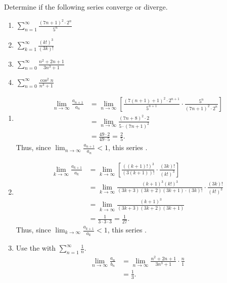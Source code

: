 \documentclass[noinstructornotes]{ximera}
\begin{document}
\begin{problem}
Determine if the following series converge or diverge.
	\begin{enumerate}
	
	\item  $\sum_{n=1}^\infty \frac{(7n+1)^2 \cdot 2^n}{5^n}$
	
	
	\item $\sum_{k=1}^{\infty} \frac{(k!)^3}{(3k)!}$
	
	\item  $\sum_{n=0}^\infty \frac{n^2 + 2n + 1}{3n^3+1}$
	
	\item  $\sum_{n=0}^\infty \frac{\cos^2 n}{n^3+1}$
	
	
	\end{enumerate}
	
	\begin{freeResponse}
		\begin{enumerate}
	
		\item  {}
			\begin{align*}
			\lim_{n \to \infty} \frac{a_{n+1}}{a_n} 
			&= \lim_{n \to \infty} \left[ \frac{(7(n+1) + 1)^2 \cdot 2^{n+1}}{5^{n+1}} \cdot \frac{5^n}{(7n+1)^2 \cdot 2^n} \right]  \\
			&= \lim_{n \to \infty} \frac{(7n+8)^2 \cdot 2}{5 \cdot (7n+1)^2}  \\
			&= \frac{49 \cdot 2}{49 \cdot 5} = \frac{2}{5}.
			\end{align*}
		Thus, since $\lim_{n \to \infty} \frac{a_{n+1}}{a_n} < 1$, this series .  
	

		\item {}
		\begin{align*}
			\lim_{k \to \infty} \frac{a_{k+1}}{a_k} 
			&= \lim_{k \to \infty} \left[ \frac{( (k+1)!)^3}{(3(k+1))!}  \cdot \frac{(3k)!}{(k!)^3} \right]  \\
			&= \lim_{k \to \infty} \frac{ (k+1)^3 (k!)^3}{(3k+3)(3k+2)(3k+1) \cdot (3k)!} \cdot \frac{(3k)!}{(k!)^3} \\
			&= \lim_{k \to \infty} \frac{(k+1)^3}{(3k+3)(3k+2)(3k+1)}  \\
			&= \frac{1}{3 \cdot 3 \cdot 3}= \frac{1}{27}.
			\end{align*}
		Thus, since $\lim_{k \to \infty} \frac{a_{k+1}}{a_k} < 1$, this series . 
		
			
			\item  Use the  with $\sum_{n=1}^\infty \frac{1}{n}$.
			\begin{align*}
			\lim_{n \to \infty} \frac{a_n}{b_n}
			&= \lim_{n \to \infty} \frac{n^2+2n+1}{3n^3+1} \cdot \frac{n}{1}  \\
			&= \frac{1}{3}.
			\end{align*}
			

\end{enumerate}
\end{freeResponse}
\end{problem}
\end{document}
